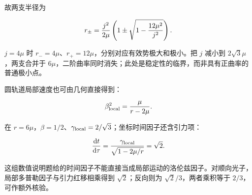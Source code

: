 \documentclass[12pt,a4paper,UTF8]{ctexart}
\begin{document}
故两支半径为

\[
r_\pm={j^2\over2\mu}\left(1\pm\sqrt{1-{12\mu^2\over j^2}}\right).
\]

\(j=4\mu\) 时 \(r_-=4\mu\)、\(r_+=12\mu\)，分别对应有效势极大和极小。把
\(j\) 减小到 \(2\sqrt3\mu\)，两支合并于
\(6\mu\)，二阶曲率同时消失；此处是稳定性的临界，而非具有正曲率的普通极小点。

圆轨道局部速度也可由几何直接得到：

\[
\beta_{\rm local}^2={\mu\over r-2\mu}.
\]

在
\(r=6\mu\)，\(\beta=1/2\)、\(\gamma_{\rm local}=2/\sqrt3\)；坐标时间因子还含引力项：

\[
{\mathrm dt\over\mathrm d\tau}
={\gamma_{\rm local}\over\sqrt{1-2\mu/r}}=\sqrt2.
\]

这组数值说明题给的时间因子不能直接当成局部运动的洛伦兹因子。对顺向光子，局部多普勒因子与引力红移相乘得到
\(\sqrt2\)；反向则为 \(\sqrt2/3\)，两者乘积等于 \(2/3\)，可作额外核验。
\end{document}

